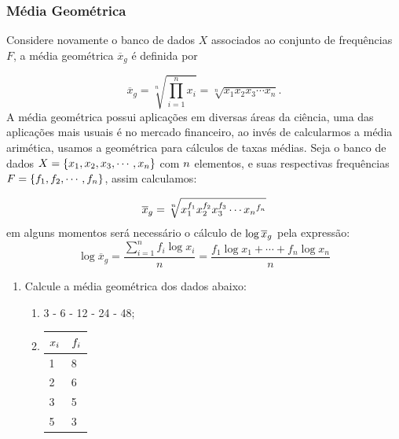 \subsubsection{Média Geométrica}
Considere novamente o banco de dados $X$ associados ao conjunto de frequências $F$, a média geométrica $\overline{x}_g$ é definida por

\begin{equation}
    \overline{x}_g = \sqrt[n]{\prod_{i=1}^nx_i} = \sqrt[n]{x_1x_2x_3\cdots x_n}.
\end{equation}
\inic A média geométrica possui aplicações em diversas áreas da ciência, uma das aplicações mais usuais é no mercado financeiro, ao invés de calcularmos a média arimética, usamos a geométrica para cálculos de taxas médias.
Seja o banco de dados $\mathnormal{X}= \{\mathnormal{x}_1,\mathnormal{x}_2,\mathnormal{x}_3,\cdots, \mathnormal{x_n}\}$ com $\mathnormal{n}$ elementos, e suas respectivas frequências $\mathnormal{F} = \{\mathnormal{f}_1,\mathnormal{f}_2,\cdots,\mathnormal{f_n}\}$, assim calculamos:


\begin{equation}
	\overline{\mathnormal{x}}_{\mathnormal{g}} = \sqrt[\mathnormal{n}]{\mathnormal{x}_1^{\mathnormal{f}_1}\mathnormal{x}_2^{\mathnormal{f}_2}\mathnormal{x}_3^{\mathnormal{f}_3}\cdots \mathnormal{x_n}^{\mathnormal{f_n}}}
\end{equation}
em alguns momentos será necessário o cálculo de $\log \mathnormal{\overline{x}_g}$ pela expressão:
\begin{equation*}
	\log \overline{x}_g = \dfrac{\displaystyle\sum_{i=1}^{n} f_i \log x_i}{n} = \frac{f_1 \log x_1 + \cdots + f_n \log x_n}{n}
\end{equation*}

\noindent \exemplo
\begin{enumerate}
	\item[(i)] Calcule a média geométrica dos dados abaixo:
		\begin{enumerate}
			\item[(a)] 3 - 6 - 12 - 24 - 48;
			\item[(b)] \begin{tabular}{ll}
				\hline
				$\mathnormal{x_i}$ & $\mathnormal{f_i}$\\
				\hline
				1 & 8 \\
				2 & 6 \\
				3 & 5 \\
				5 & 3 \\
				\hline
			\end{tabular}
		\end{enumerate}
	\end{enumerate}

